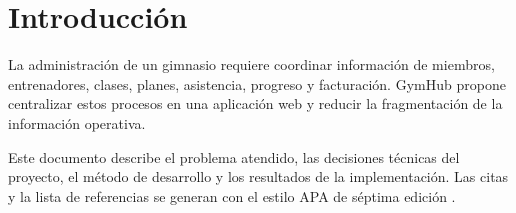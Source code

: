 \section{Introducción}

La administración de un gimnasio requiere coordinar información de miembros,
entrenadores, clases, planes, asistencia, progreso y facturación. GymHub propone
centralizar estos procesos en una aplicación web y reducir la fragmentación de
la información operativa.

Este documento describe el problema atendido, las decisiones técnicas del
proyecto, el método de desarrollo y los resultados de la implementación. Las
citas y la lista de referencias se generan con el estilo APA de séptima edición
\parencite{apa2020}.
